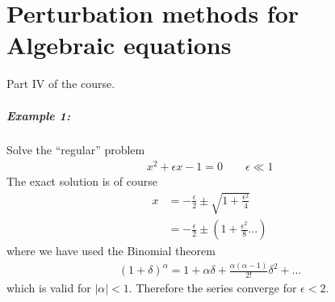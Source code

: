 \chapter[Perturbation for algebraic equations]{Perturbation methods for Algebraic equations}\label{sec:pert-algebra}

Part IV of the course. 

\paragraph{Example 1:} Solve the ``regular'' problem
\begin{gather*}
	x^2 + \epsilon x - 1=0 \qquad \epsilon \ll 1
\end{gather*}
The exact solution is of course
\begin{align*}
	x &= -\frac{\epsilon}{2} \pm  \sqrt{1 + \frac{\epsilon^2}{4}} \\
	&= -\frac{\epsilon}{2} \pm \left(1 + \frac{\epsilon^2}{8} \dots \right)
\end{align*}
where we have used the Binomial theorem 
\begin{gather*}
	(1 + \delta)^\alpha = 1 + \alpha \delta + \frac{\alpha(\alpha-1)}{2!} \delta^2 + \dots 
\end{gather*}
which is valid for $|\alpha| < 1$. Therefore the series converge for $\epsilon < 2$. 

